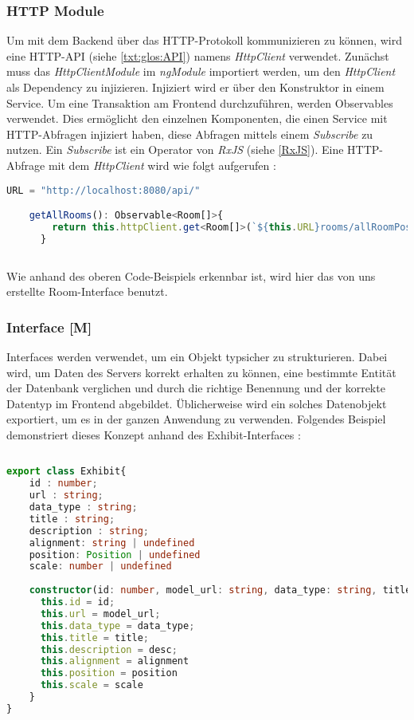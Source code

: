 \subsubsection{HTTP Module}
\label{httpService}
\label{sec:HTTPModule}
Um mit dem Backend über das HTTP-Protokoll kommunizieren zu können, wird eine HTTP-API (siehe \ref{txt:glos:API}) namens \emph{HttpClient} verwendet. Zunächst muss das \emph{HttpClientModule} im \emph{ngModule} importiert werden, um den \emph{HttpClient}  als Dependency zu injizieren. Injiziert wird er über den Konstruktor in einem Service. Um eine Transaktion am Frontend durchzuführen, werden Observables verwendet. Dies ermöglicht den einzelnen Komponenten, die einen Service mit HTTP-Abfragen injiziert haben, diese Abfragen mittels einem \emph{Subscribe} zu nutzen. Ein \emph{Subscribe} ist ein Operator von \emph{RxJS} (siehe \ref{RxJS}). Eine HTTP-Abfrage mit dem \emph{HttpClient} wird wie folgt aufgerufen \cite{AngularBuch} \cite{AngularHTTPClient}:

\begin{lstlisting}[caption={HttpClient Abfragen},  language=TypeScript,label=lst:impl:httpclientrequests]   
    URL = "http://localhost:8080/api/"

    getAllRooms(): Observable<Room[]>{
        return this.httpClient.get<Room[]>(`${this.URL}rooms/allRoomPositions`);
      }
    
\end{lstlisting}

Wie anhand des oberen Code-Beispiels erkennbar ist, wird hier das von uns erstellte Room-Interface benutzt.

\subsubsection{Interface [M]}
\label{interface}
Interfaces werden verwendet, um ein Objekt typsicher zu strukturieren. Dabei wird, um Daten des Servers korrekt erhalten zu können, eine bestimmte Entität der Datenbank verglichen und durch die richtige Benennung und der korrekte Datentyp im Frontend abgebildet. Üblicherweise wird ein solches Datenobjekt exportiert, um es in der ganzen Anwendung zu verwenden. Folgendes Beispiel demonstriert dieses Konzept anhand des Exhibit-Interfaces \cite{AngularBuch}: 

\begin{lstlisting}[caption={Das Datenmodell eines Ausstelungsstückes},  language=TypeScript,label=lst:impl:httpclientrequests]   
  
export class Exhibit{
    id : number;
    url : string;
    data_type : string;
    title : string;
    description : string;
    alignment: string | undefined
    position: Position | undefined
    scale: number | undefined
  
    constructor(id: number, model_url: string, data_type: string, title: string, desc: string, alignment: string | undefined, position: Position | undefined, scale: number | undefined) {
      this.id = id;
      this.url = model_url;
      this.data_type = data_type;
      this.title = title;
      this.description = desc;
      this.alignment = alignment
      this.position = position
      this.scale = scale
    }
}
\end{lstlisting}

